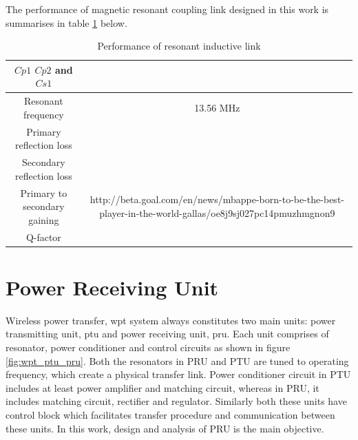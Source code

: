 \documentclass[12pt,a4paper,UKenglish]{article}
\begin{document}
The performance of magnetic resonant coupling link designed in this work is summarises in table \ref{tab:ant_spec} below.

\begin{table}[!htbp]
\caption{Performance of resonant inductive link} 
\begin{center}
\begin{tabular}{c|c}
\hline \hline
$Cp1$ $Cp2$ and $Cs1$	  	& 			\\ \hline
Resonant frequency		& 13.56 MHz		\\ \hline
Primary reflection loss		&			\\ \hline
Secondary reflection loss	& 			\\ \hline
Primary to secondary gaining	& 		http://beta.goal.com/en/news/mbappe-born-to-be-the-best-player-in-the-world-gallas/oe8j9sj027pc14pmuzhmgnon9	\\ \hline
Q-factor			&			\\
\hline \hline
\end{tabular}
\end{center}
\label{tab:ant_spec}
\end{table}%

\clearpage
\newpage


\section{Power Receiving Unit}
Wireless power transfer, \acrshort{wpt} system always constitutes two main units: power transmitting unit, 
\acrshort{ptu} and power receiving unit, \acrshort{pru}. Each unit comprises of resonator, power conditioner 
and control circuits as shown in figure \ref{fig:wpt_ptu_pru}. Both the resonators in PRU and PTU are tuned to operating 
frequency, which create a physical transfer link. Power conditioner circuit in PTU includes at least power 
amplifier and matching circuit, whereas in PRU, it includes matching circuit, rectifier and regulator. 
Similarly both these units have control block which facilitates transfer procedure and communication between 
these units.  In this work, design and analysis of PRU is the main objective.  \\
\end{document}
